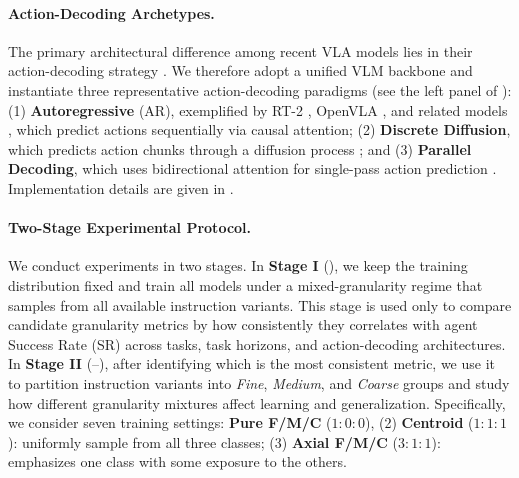 \documentclass[11pt]{article}
\begin{document}
\paragraph{Action-Decoding Archetypes.}
The primary architectural difference among recent VLA models lies in their action-decoding strategy \citep{zhong2025survey}. 
We therefore adopt a unified VLM backbone and instantiate three representative action-decoding paradigms (see the left panel of ): 
(1) \textbf{Autoregressive} (AR), exemplified by RT-2 \citep{DBLP:conf/corl/ZitkovichYXXXXW23}, OpenVLA \citep{DBLP:conf/corl/KimPKXB0RFSVKBT24}, and related models \citep{DBLP:journals/tmlr/ReedZPCNBGSKSEBREHCHVBF22,DBLP:conf/icml/HuangYMLLW0ZJ024,DBLP:conf/icra/ONeillRMGPLPGMJ24}, which predict actions sequentially via causal attention; 
(2) \textbf{Discrete Diffusion}, which predicts action chunks through a diffusion process \citep{pmlr-v305-black25a,bjorck2025gr00t,shukor2025smolvla,liang2025discrete}; and 
(3) \textbf{Parallel Decoding}, which uses bidirectional attention for single-pass action prediction \citep{kim2025fine,DBLP:conf/iros/SongCDZZZGLWWML25,yin2025deepthinkvla,wang2025bitvla,xiao2025ava}. 
Implementation details are given in .

\paragraph{Two-Stage Experimental Protocol.}
\label{sec:experimental_protocol}
We conduct experiments in two stages. 
In \textbf{Stage I} (), we keep the training distribution fixed and train all models under a mixed-granularity regime that samples from all available instruction variants. 
This stage is used only to compare candidate granularity metrics by how consistently they correlates with agent Success Rate (SR) across tasks, task horizons, and action-decoding architectures. 
In \textbf{Stage II} (--), after identifying which is the most consistent metric, we use it to partition instruction variants into \emph{Fine}, \emph{Medium}, and \emph{Coarse} groups and study how different granularity mixtures affect learning and generalization. 
Specifically, we consider seven training settings: \textbf{Pure F/M/C} ($1\!:\!0\!:\!0$), (2) \textbf{Centroid} ($1\!:\!1\!:\!1$): uniformly sample from all three classes; (3) \textbf{Axial F/M/C} ($3\!:\!1\!:\!1$): emphasizes one class with some exposure to the others.
\end{document}
